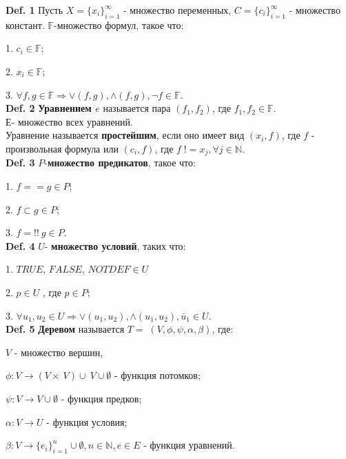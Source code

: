 \documentclass[12pt]{article}
\begin{document}
 
	{\bf Def. 1} Пусть $X = \lbrace  x_{i}  \rbrace_{i=1}^{\infty} $ - множество переменных,
	$C = \lbrace  c_{i}  \rbrace_{i=1}^{\infty} $ - множество констант. $\mathbb{F}$-множество формул, такое что:
	
	1. $c_{i} \in \mathbb{F} $; 
	
	2. $x_{i} \in \mathbb{F} $; 
	
	3. $\forall f, g \in \mathbb{F} \Rightarrow \vee(f,g), \wedge(f,g), \neg f \in \mathbb{F}$.
	\\

	{\bf Def. 2} {\bf Уравнением  $e$} называется пара $(f_{1},f_{2})$, где $f_{1},f_{2} \in \mathbb{F}$.\\Е- множество всех уравнений.
	\\Уравнение называется {\bf простейшим}, если оно имеет вид $(x_{i}, f)$, где $f$ - произвольная формула или $(c_{i}, f)$, где $f \; != x_{j}, \forall j \in \mathbb{N}$.
	\\
	
	{\bf Def. 3} $P$-{\bf множество предикатов}, такое что: 
	
	1. $f==g \in P$; 
	
    2. $f \subset g \in P$;
    
    3. $f =!! \: g \in P$.
    \\
    
    {\bf Def. 4}  $U$- {\bf множество условий}, таких что: 
    
    1. $TRUE$, $FALSE$, $NOTDEF \in U$
    
    2. $p \in U$ , где $p \in P$;
    
    3. $\forall u_{1}, u_{2} \in U \Rightarrow \vee(u_{1},u_{2}), \wedge(u_{1},u_{2}), \bar u_{1} \in U$.
    \\
    
     \hypertarget{d5}{{\bf Def. 5}} {\bf Деревом} называется $T = \; (V,\phi,\psi, \alpha, \beta)$, где: 
     
     $V$ - множество вершин,
     
      $\phi : V \rightarrow (V\times \:V)\cup \:V \cup \emptyset$ - функция потомков;
      
      $\psi : V \rightarrow V \cup \emptyset$ - функция предков;
      
      $\alpha : V \rightarrow U$ - функция условия;
      
      $\beta : V \rightarrow \lbrace  e_{i}  \rbrace_{i=1}^{n} \cup \emptyset, n \in \mathbb{N}, e \in E $ - функция уравнений.
     \\
     
\end{document}
